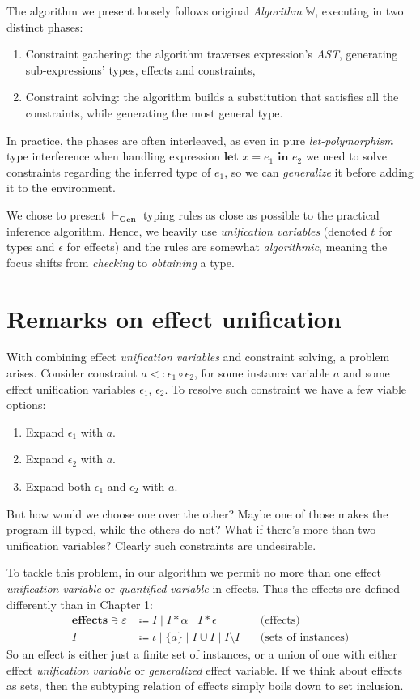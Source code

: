 \documentclass[declaration,shortabstract]{iithesis}
\begin{document}
The algorithm we present loosely follows original \textit{Algorithm} $\mathbb{W}$, executing in two distinct phases:
\begin{enumerate}
    \item Constraint gathering: the algorithm traverses expression's \textit{AST}, generating sub-expressions' types, effects and constraints,
    \item Constraint solving: the algorithm builds a substitution that satisfies all the constraints, while generating the most general type.
\end{enumerate}
In practice, the phases are often interleaved, as even in pure \textit{let-polymorphism} type interference when handling expression $\textbf{let } x = e_1 \textbf{ in } e_2$  we need to solve constraints regarding the inferred type of $e_1$, so we can \textit{generalize} it before adding it to the environment.

We chose to present  $\vdash_\textbf{Gen}$ typing rules as close as possible
to the practical inference algorithm.
Hence, we heavily use \textit{unification variables}
(denoted $t$ for types and $\epsilon$ for effects) 
and the rules are somewhat \textit{algorithmic}, meaning the focus shifts from \textit{checking} to \textit{obtaining} a type.

\section{Remarks on effect unification}
With combining effect \textit{unification variables} and constraint solving, a problem arises.
Consider constraint $a <: \epsilon_1 \circ \epsilon_2$,
for some instance variable $a$ and some effect unification variables $\epsilon_1$, $\epsilon_2$.
To resolve such constraint we have a few viable options:
\begin{enumerate}
    \item Expand $\epsilon_1$ with $a$.
    \item Expand $\epsilon_2$ with $a$.
    \item Expand both $\epsilon_1$ and $\epsilon_2$ with $a$.
\end{enumerate}
But how would we choose one over the other? Maybe one of those makes the program ill-typed, while the others do not? What if there's more than two unification variables? Clearly such constraints are undesirable.

To tackle this problem, in our algorithm we permit no more than one effect
\textit{unification variable} or \textit{quantified variable} in effects.
Thus the effects are defined differently than in Chapter 1:
\begin{align*} 
    \textbf{effects} \ni \varepsilon & \Coloneqq
    I \mid 
    I * \alpha \mid 
    I * \epsilon  &  \text{(effects)}
\\
    I & \Coloneqq \iota \mid \{a\} \mid I \cup I \mid I \setminus I
    \quad & \text{(sets of instances)}
\end{align*}
So an effect is either just a finite set of instances, or a union of one with either effect \textit{unification variable} or \textit{generalized} effect variable.
If we think about effects as sets,
then the subtyping relation of effects simply boils down to set inclusion.
\end{document}
